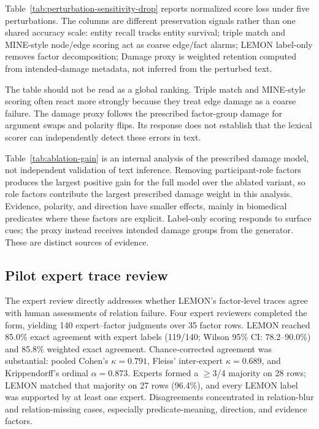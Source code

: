 Table~\ref{tab:perturbation-sensitivity-drop} reports normalized score loss under five perturbations. The columns are different preservation signals rather than one shared accuracy scale: entity recall tracks entity survival; triple match and MINE-style node/edge scoring act as coarse edge/fact alarms; LEMON label-only removes factor decomposition; Damage proxy is weighted retention computed from intended-damage metadata, not inferred from the perturbed text.



The table should not be read as a global ranking. Triple match and MINE-style scoring often react more strongly because they treat edge damage as a coarse failure. The damage proxy follows the prescribed factor-group damage for argument swaps and polarity flips. Its response does not establish that the lexical scorer can independently detect these errors in text.



Table~\ref{tab:ablation-gain} is an internal analysis of the prescribed damage model, not independent validation of text inference. Removing participant-role factors produces the largest positive gain for the full model over the ablated variant, so role factors contribute the largest prescribed damage weight in this analysis. Evidence, polarity, and direction have smaller effects, mainly in biomedical predicates where these factors are explicit. Label-only scoring responds to surface cues; the proxy instead receives intended damage groups from the generator. These are distinct sources of evidence.



\subsection{Pilot expert trace review}\label{sec:expert-trace-review}
The expert review directly addresses whether LEMON's factor-level traces agree with human assessments of relation failure. Four expert reviewers completed the form, yielding 140 expert--factor judgments over 35 factor rows. LEMON reached 85.0\% exact agreement with expert labels (119/140; Wilson 95\% CI: 78.2--90.0\%) and 85.8\% weighted exact agreement. Chance-corrected agreement was substantial: pooled Cohen's $\kappa=0.791$, Fleiss' inter-expert $\kappa=0.689$, and Krippendorff's ordinal $\alpha=0.873$. Experts formed a $\geq$3/4 majority on 28 rows; LEMON matched that majority on 27 rows (96.4\%), and every LEMON label was supported by at least one expert. Disagreements concentrated in relation-blur and relation-missing cases, especially predicate-meaning, direction, and evidence factors.

